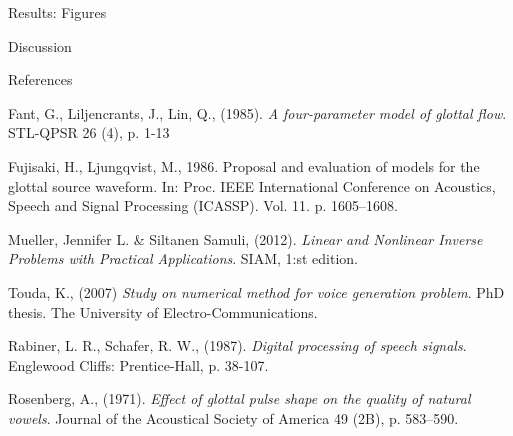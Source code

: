\documentclass[final]{beamer}
\begin{document}
\begin{frame}[t]
\begin{columns}[t]
\begin{column}{.465\textwidth}
\begin{block}{Results: Figures}
\end{block}


\begin{block}{Discussion}



\end{block}


\begin{block}{References}

\begin{scriptsize}


\begin{thebibliography}{9}

    Fant, G., Liljencrants, J., Lin, Q., (1985).
    \emph{A four-parameter model of glottal flow}.
    STL-QPSR 26 (4), p. 1-13
    
    Fujisaki, H., Ljungqvist, M., 1986.
    Proposal and evaluation of models for the glottal source waveform.
    In: Proc. IEEE International Conference on Acoustics, Speech and Signal Processing (ICASSP). Vol. 11. p. 1605–1608.
    
	Mueller, Jennifer L. \& Siltanen Samuli, (2012).
	\emph{Linear and Nonlinear Inverse Problems with Practical Applications}.
	SIAM, 1:st edition.
	
    Touda, K., (2007)
    \emph{Study on numerical method for voice generation problem}.
    PhD thesis.
    The University of Electro-Communications.
    
    Rabiner, L. R., Schafer, R. W., (1987).
    \emph{Digital processing of speech signals}.
    Englewood Cliffs: Prentice-Hall, p. 38-107.

    Rosenberg, A., (1971).
    \emph{Effect of glottal pulse shape on the quality of natural vowels}.
    Journal of the Acoustical Society of America 49 (2B), p. 583–590.

\end{thebibliography}



\end{scriptsize}
\end{block}
\end{column}
\end{columns}
\end{frame}
\end{document}
